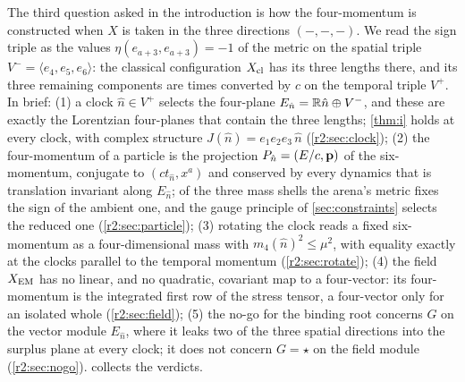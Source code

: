 The third question asked in the introduction is how the four-momentum is constructed when $X$ is taken in the three directions
$(-,-,-)$. We read the sign triple as the values $\eta(e_{a+3},e_{a+3})=-1$ of the metric on the spatial triple $V^-=\langle e_4,e_5,e_6\rangle$:
the classical configuration $X_{\rm cl}$ has its three lengths there, and its three remaining components are times converted by $c$ on the
temporal triple $V^+$. In brief:
(1) a clock $\hat n\in V^+$ selects the four-plane $E_{\hat n}=\mathbb{R} \hat n\oplus V^-$, and these are exactly the Lorentzian four-planes that contain the three
lengths; \cref{thm:i} holds at every clock, with complex structure $J(\hat n)=e_1e_2e_3\,\hat n$ (\cref{r2:sec:clock});
(2) the four-momentum of a particle is the projection $P_{\hat n}=(E/c,\mathbf p)$ of the six-momentum, conjugate to $(ct_{\hat n},x^a)$ and conserved by every dynamics
that is translation invariant along $E_{\hat n}$; of the three mass shells the arena's metric fixes the sign of the ambient one, and the gauge
principle of \cref{sec:constraints} selects the reduced one (\cref{r2:sec:particle});
(3) rotating the clock reads a fixed six-momentum as a four-dimensional mass with $m_4(\hat n)^2\le\mu^2$, with equality exactly at the clocks
parallel to the temporal momentum (\cref{r2:sec:rotate});
(4) the field $X_{\rm EM}$ has no linear, and no quadratic, covariant map to a four-vector: its four-momentum is the integrated first row of the
stress tensor, a four-vector only for an isolated whole (\cref{r2:sec:field});
(5) the no-go for the binding root concerns $G$ on the vector module $E_{\hat n}$, where it leaks two of the three spatial directions into the surplus
plane at every clock; it does not concern $G=\star$ on the field module (\cref{r2:sec:nogo}).
 collects the verdicts.

